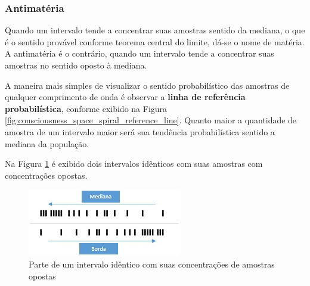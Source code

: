 \subsubsection{Antimatéria}
Quando um intervalo tende a concentrar suas amostras sentido da mediana, o que é o sentido provável conforme teorema central do limite, dá-se o nome de matéria. A antimatéria é o contrário, quando um intervalo tende a concentrar suas amostras no sentido oposto à mediana. 

A maneira mais simples de visualizar o sentido probabilístico das amostras de qualquer comprimento de onda é observar a \textbf{linha de referência probabilística}, conforme exibido na Figura \ref{fig:consciousness_space_spiral_reference_line}. Quanto maior a quantidade de amostra de um intervalo maior será sua tendência probabilística sentido a mediana da população.

Na Figura \ref{fig:consciousness_concentration_of_opposite_samples} é exibido dois intervalos idênticos com suas amostras com concentrações opostas.
	\begin{figure}[H]
	\caption{Parte de um intervalo idêntico com suas concentrações de amostras opostas}
	\label{fig:consciousness_concentration_of_opposite_samples}
	\centering
	\includegraphics[scale=1.2]{sections/images/consciousness_concentration_of_opposite_samples.jpg}
	\end{figure}

